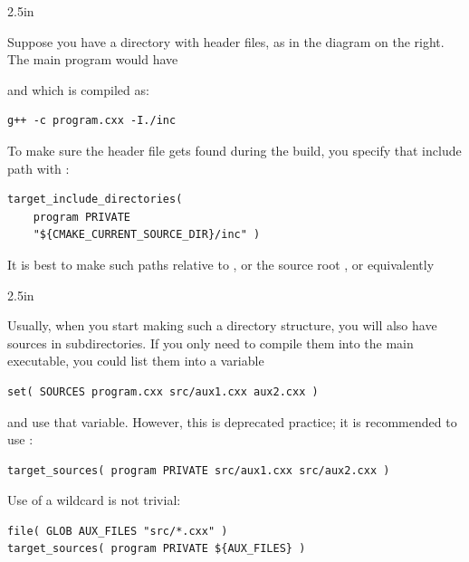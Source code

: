 \begin{floatingfigure}[r]{2.5in}
  \begin{minipage}{2.5in}
  \end{minipage}
\end{floatingfigure}
%
Suppose you have a directory with header files,
as in the diagram on the right.
The main program would have

and which is compiled as:
\begin{lstlisting}[language=shell]
g++ -c program.cxx -I./inc
\end{lstlisting}
To make sure the header file gets found during the build,
you specify that include path with :
\begin{lstlisting}
target_include_directories(
	program PRIVATE
	"${CMAKE_CURRENT_SOURCE_DIR}/inc" )
\end{lstlisting}
It is best to make such paths relative to
,
or the source root ,
or equivalently 

\begin{floatingfigure}[r]{2.5in}\vskip3in\end{floatingfigure}
%
Usually, when you start making such a directory structure,
you will also have sources in subdirectories.
If you only need to compile them into the main executable,
you could list them into a variable
\begin{lstlisting}
set( SOURCES program.cxx src/aux1.cxx aux2.cxx )
\end{lstlisting}
and use that variable.
However, this is deprecated practice;
it is recommended to use :
\begin{lstlisting}
target_sources( program PRIVATE src/aux1.cxx src/aux2.cxx )
\end{lstlisting}
Use of a wildcard is not trivial:
\begin{lstlisting}
file( GLOB AUX_FILES "src/*.cxx" )
target_sources( program PRIVATE ${AUX_FILES} )
\end{lstlisting}

